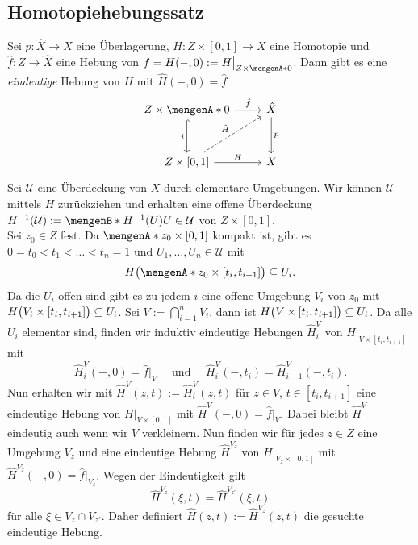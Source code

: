 \subsection{Homotopiehebungssatz} %
\label{sub:108}
Sei $p : \hat{X} \to X$ eine Überlagerung, $H : Z \times [0,1] \to X$ eine Homotopie und $\hat{f} : Z \to \hat{X}$ eine Hebung von 
$f = H(-,0) := H\big|_{Z \times \set{0}}$. Dann gibt es eine \emph{eindeutige} Hebung von $H$ mit $\hat{H}(-,0)= \hat{f}$
\[
	\begin{tikzcd}[row sep=3em]
		Z \times \set{0} \dar[hook, swap]{i} \rar{\hat{f}}& \hat{X} \dar{p} \\
		Z \times [0,1] \urar[dashed]{\hat{H}} \rar{H}& X  
	\end{tikzcd}
\]
Sei $\mathcal{U}$ eine Überdeckung von $X$ durch elementare Umgebungen. Wir können $\mathcal{U}$ mittels $H$ zurückziehen und erhalten eine offene Überdeckung
$H ^{-1}(\mathcal{U}) := \set[H ^{-1}(U)]{U \in \mathcal{U}}$ von $Z \times [0,1]$. \\
Sei $z_0 \in Z$ fest. Da $\set{z_0} \times [0,1]$ kompakt ist, gibt es 
$0 = t_0 < t_1 < \ldots < t_n=1$ und $U_1, \ldots , U_n \in \mathcal{U}$ mit 
\[
	H \enbrace[\big]{\set{z_0} \times [t_i, t_{i+1}] } \subseteq U_i .
\]
Da die $U_i$ offen sind gibt es zu jedem $i$ eine offene Umgebung $V_i$ von $z_0$ mit $H\enbrace[\big]{V_i \times[t_i, t_{i+1}]} \subseteq U_i$. Sei 
$V := \bigcap_{i=1}^n V_i$, dann ist $H \enbrace[\big]{V \times [t_i, t_{i+1}]} \subseteq U_i$. Da alle $U_i$ elementar sind, finden wir induktiv eindeutige Hebungen
$\hat{H}_i^V$ von $H\big|_{V \times [t_i, t_{i+1}]}$ mit 
\[
	\hat{H}_i^V(-,0)= \hat{f}\big|_{V}\quad \text{ und } \quad \hat{H}_i^V(-,t_{i}) = \hat{H}_{i-1}^V (-, t_{i}).
\]
Nun erhalten wir mit $\hat{H}^V(z,t) := \hat{H}_i^V(z,t)$ für $z \in V$, $t \in [t_{i},t_{i+1}]$ eine eindeutige Hebung von $H\big|_{V \times [0,1]}$ mit 
$\hat{H}^V(-,0) = \hat{f}\big|_V$. Dabei bleibt $\hat{H}^V$ eindeutig auch wenn wir $V$ verkleinern. Nun finden wir für jedes $z \in Z$ eine Umgebung $V_z$ und eine 
eindeutige Hebung $\hat{H}^{V_z}$ von $H\big|_{V_z \times [0,1]}$ mit 
\(
	\hat{H}^{V_z} (-,0) = \hat{f}\big|_{V_z}
\).
Wegen der Eindeutigkeit gilt 
\[
	\hat{H}^{V_z} (\xi,t) = \hat{H}^{V_{z'}}(\xi,t)
\]
für alle $\xi \in V_z \cap V_{z'}$. Daher definiert $\hat{H}(z,t) := \hat{H}^{V_z}(z,t)$ die gesuchte eindeutige Hebung. \bewende
\newpage


